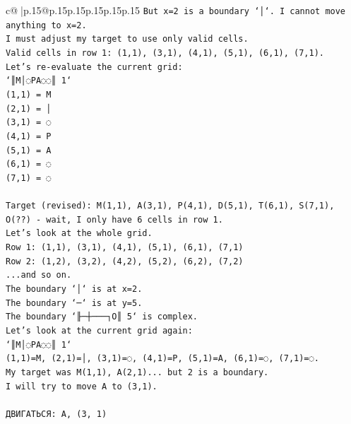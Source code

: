 \documentclass{article}
\begin{document}
{\begin{supertabular}{c@{$\;$}|p{.15\linewidth}@{}p{.15\linewidth}p{.15\linewidth}p{.15\linewidth}p{.15\linewidth}p{.15\linewidth}}
{{{\texttt{But x=2 is a boundary `│`. I cannot move anything to x=2.} \\
\texttt{I must adjust my target to use only valid cells.} \\
\texttt{Valid cells in row 1: (1,1), (3,1), (4,1), (5,1), (6,1), (7,1).} \\
\texttt{Let's re{-}evaluate the current grid:} \\
\texttt{`║M│◌PA◌◌║ 1`} \\
\texttt{(1,1) = M} \\
\texttt{(2,1) = │} \\
\texttt{(3,1) = ◌} \\
\texttt{(4,1) = P} \\
\texttt{(5,1) = A} \\
\texttt{(6,1) = ◌} \\
\texttt{(7,1) = ◌} \\
\\ 
\texttt{Target (revised): M(1,1), A(3,1), P(4,1), D(5,1), T(6,1), S(7,1), O(??) {-} wait, I only have 6 cells in row 1.} \\
\texttt{Let's look at the whole grid.} \\
\texttt{Row 1: (1,1), (3,1), (4,1), (5,1), (6,1), (7,1)} \\
\texttt{Row 2: (1,2), (3,2), (4,2), (5,2), (6,2), (7,2)} \\
\texttt{...and so on.} \\
\texttt{The boundary `│` is at x=2.} \\
\texttt{The boundary `─` is at y=5.} \\
\texttt{The boundary `╟─┼───┐O║ 5` is complex.} \\
\texttt{Let's look at the current grid again:} \\
\texttt{`║M│◌PA◌◌║ 1`} \\
\texttt{(1,1)=M, (2,1)=│, (3,1)=◌, (4,1)=P, (5,1)=A, (6,1)=◌, (7,1)=◌.} \\
\texttt{My target was M(1,1), A(2,1)... but 2 is a boundary.} \\
\texttt{I will try to move A to (3,1).} \\
\\ 
\texttt{ДВИГАТЬСЯ: A, (3, 1)} \\
            }
        }
    }
     \\ \\


\end{supertabular}}
\end{document}
